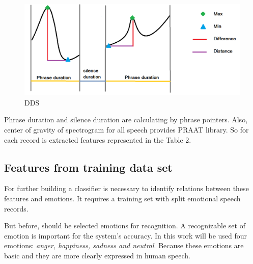 \documentclass[12pt, letterpaper]{article}
\begin{document}
\begin{figure}
	\centering
		\includegraphics[scale=0.5]{images/dds.png}
	\caption{DDS}
	\label{fig:dds}
\end{figure}
Phrase duration and silence duration are calculating by phrase pointers. Also, center of gravity of spectrogram for all speech provides PRAAT library. So for each record is extracted features represented in the Table 2.
\subsection{Features from training data set}
For further building a classifier is necessary to identify relations between these features and emotions. It requires a training set with split emotional speech records. 

But before, should be selected emotions for recognition. A recognizable set of emotion is important for the system's accuracy. In this work will be used four emotions: \emph{anger, happiness, sadness and neutral}. Because these emotions are basic and they are more clearly expressed in human speech.
\end{document}
